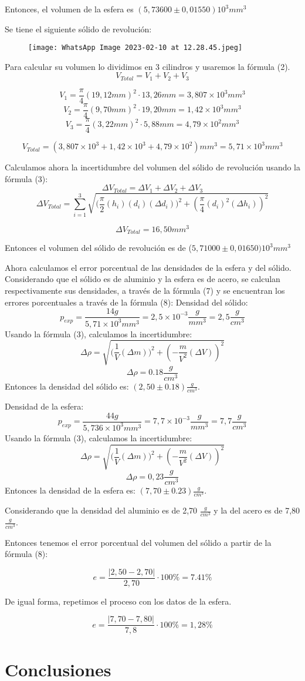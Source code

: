 \documentclass[a4paper]{article}
\begin{document}
Entonces, el volumen de la esfera es $(5,73600\pm 0,01550)10^3  mm^3$

Se tiene el siguiente sólido de revolución:
\begin{figure}[H]
  \centering
  \texttt{[image: WhatsApp Image 2023-02-10 at 12.28.45.jpeg]}
\end{figure}

Para calcular su volumen lo dividimos en 3 cilindros y usaremos la fórmula (2).
\[V_{Total}=V_1+V_2+V_3\]

\[V_1= \frac{\pi}{4}(19,12mm)^2\cdot 13,26mm=3,807
\times 10^3 mm^3\]
\[V_2= \frac{\pi}{4}(9,70mm)^2\cdot 19,20mm=1,42\times 10^3 mm^3\]
\[V_3= \frac{\pi}{4}(3,22mm)^2\cdot 5,88mm=4,79\times 10^2 mm^3\]

\[V_{Total}=(3,807\times 10^3+1,42\times 10^3+4,79\times 10^2)mm^3=5,71\times 10^3 mm^3\]

Calculamos ahora la incertidumbre del volumen del sólido de revolución usando la fórmula (3):
\[\Delta {V_{Total}}=\Delta {V_1}+\Delta {V_2}+\Delta {V_3} \]
\[\Delta{V_{Total}}= \displaystyle\sum_{i=1}^{3} \sqrt{({\frac{\pi}{2} (h_i)(d_i)(\Delta{d_i}))^2+  (\frac{\pi}{4} (d_i)^2 (\Delta{h_i}))^2}}\]

\[\Delta {V_{Total}}= 16,50 mm^3\]

Entonces el volumen del sólido de revolución es de ($5,71000 \pm {0,01650}) 10^3 mm^3 $

Ahora calculamos el error porcentual de las densidades de la esfera y del sólido. Considerando que el sólido es de aluminio y la esfera es de acero, se calculan respectivamente sus densidades, a través de la fórmula (7) y se encuentran los errores porcentuales a través de la fórmula (8):
Densidad del sólido:
\[p_{exp}=\frac{14g}{5,71\times 10^3 mm^3 }= 2,5 \times 10^{-3} \frac{g}{mm^3}=2,5\frac{g}{cm^3}\]
Usando la fórmula (3), calculamos la incertidumbre:
\[\Delta \rho=\sqrt{({\frac{1}{V}(\Delta{m}))^2+  (-\frac{m}{V^2} (\Delta{V}))^2}}\]
\[\Delta \rho=0.18 \frac{g}{cm^3}\]
Entonces la densidad del sólido es: $(2,50\pm0.18) \frac{g}{cm^3}$.

Densidad de la esfera:
\[p_{exp}=\frac{44g}{5,736 \times 10^3 mm^3}= 7,7 \times 10^{-3} \frac{g}{mm^3}=7,7\frac{g}{cm^3}\] 
Usando la fórmula (3), calculamos la incertidumbre:
\[\Delta \rho=\sqrt{({\frac{1}{V}(\Delta{m}))^2+  (-\frac{m}{V^2} (\Delta{V}))^2}}\]
\[\Delta \rho=0,23 \frac{g}{cm^3}\]
Entonces la densidad de la esfera es: $(7,70\pm0.23) \frac{g}{cm^3}$.

Considerando que la densidad del aluminio es de 2,70 $\frac{g}{cm^3}$ y la del acero es de 7,80 $\frac{g}{cm^3}$.

Entonces tenemos el error porcentual del volumen del sólido a partir de la fórmula (8):

\[e=\frac{|2,50 - 2,70|}{2,70}\cdot 100 \%=7.41\%\]

De igual forma, repetimos el proceso con los datos de la esfera.

\[e=\frac{|7,70 - 7,80|}{7,8}\cdot 100 \%=1,28\%\]

\section{Conclusiones}
\end{document}
